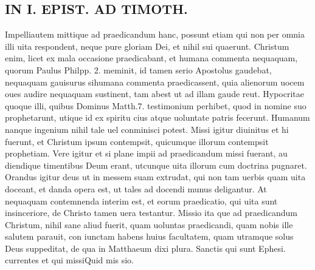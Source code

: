 \documentclass{article}
\begin{document}
\begin{pages}
\section*{IN I. EPIST. AD TIMOTH. }\pstart Impelliautem mittique ad praedicandum hanc, possunt etiam qui non per omnia illi uita respondent, neque pure gloriam Dei, et nihil sui quaerunt. Christum enim, licet ex mala occasione praedicabant, et humana commenta nequaquam, quorum Paulus Philpp. 2. meminit, id tamen serio Apostolus gaudebat, nequaquam gauisurus sihumana commenta praedicassent, quia alienorum uocem oues audire nequaquam sustinent, tam abest ut ad illam gaude reut. Hypocritae quoque illi, quibus Dominus Matth.7. testimonium perhibet, quod in nomine suo prophetarunt, utique id ex spiritu cius atque uoluntate patris fecerunt. Humanum nanque ingenium nihil tale uel conminisci potest.  Missi igitur diuinitus et hi fuerunt, et Christum ipsum contempsit, quicumque illorum contempsit prophetiam.  Vere igitur et si plane impii ad praedicandum missi fuerant, au diendique timentibus Deum erant, utcunque uita illorum cum doctrina pugnaret.   \pend\pstart Orandus igitur deus ut in messem suam extrudat, qui non tam uerbis quam uita doceant, et danda opera est, ut tales ad docendi munus deligantur. At nequaquam contemnenda interim est, et eorum praedicatio, qui uita sunt insinceriore, de Christo tamen uera testantur.  Missio ita que ad praedicandum Christum, nihil sane aliud fuerit, quam uoluntas praedicandi, quam nobis ille salutem parauit, con iunctam habens huius facultatem, quam utramque solus Deus suppeditat, de qua in Matthaeum dixi plura.  Sanctis qui sunt Ephesi.  \pendQui currentes et qui missiQuid mis sio.  

\end{pages}
\end{document}
